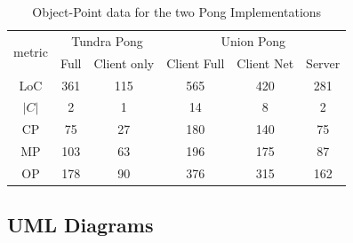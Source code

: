 \documentclass[conference]{IEEEtran}
\begin{document}
\begin{table}[!t]
\renewcommand{\arraystretch}{1.3}
\caption{Object-Point data for the two Pong Implementations}
\label{table_example}
\centering
\begin{tabular}{|c|c|c|c|c|c|}
\hline
\multirow{2}{*}{metric} & \multicolumn{2}{c|}{Tundra Pong} & \multicolumn{3}{c}{Union Pong}\tabularnewline
\cline{2-6}
& Full & Client only & \multicolumn{1}{c||}{Client Full} & Client Net & Server\tabularnewline
\hline
LoC     & 361 & 115 & 565 & 420 & 281 \\
$|C|$   & 2   & 1   & 14  & 8   & 2   \\
CP      & 75  & 27  & 180 & 140 & 75  \\
MP      & 103 & 63  & 196 & 175 & 87  \\
OP      & 178 & 90  & 376 & 315 & 162 \\
\hline
\end{tabular}
\end{table}

% 
% 
% 
% 
% 
% 
% 


\subsection{UML Diagrams%
  \label{uml-diagrams}%
}
\end{document}
